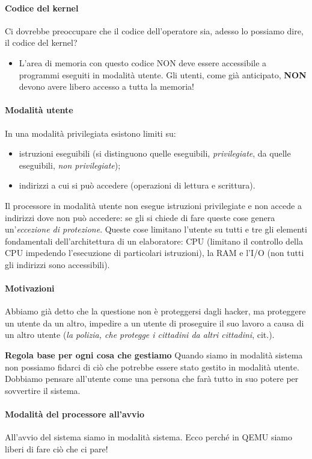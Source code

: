 \documentclass[11pt]{report}
\theoremstyle{definition}
\begin{document}
\paragraph{Codice del kernel} Ci dovrebbe preoccupare che il codice dell'operatore sia, adesso lo possiamo dire, il codice del kernel? 
\begin{itemize}
	\item L'area di memoria con questo codice NON deve essere accessibile a programmi eseguiti in modalità utente. Gli utenti, come già anticipato, \textbf{NON} devono avere libero accesso a tutta la memoria!
\end{itemize}
\paragraph{Modalità utente} In una modalità privilegiata esistono limiti su:
\begin{itemize}
	\item istruzioni eseguibili (si distinguono quelle eseguibili, \emph{privilegiate}, da quelle eseguibili, \emph{non privilegiate});
	\item indirizzi a cui si può accedere (operazioni di lettura e scrittura).
\end{itemize}
Il processore in modalità utente non esegue istruzioni privilegiate e non accede a indirizzi dove non può accedere: se gli si chiede di fare queste cose genera un'\emph{eccezione di protezione}. Queste cose limitano l'utente su tutti e tre gli elementi fondamentali dell'architettura di un elaboratore: CPU (limitano il controllo della CPU impedendo l'esecuzione di particolari istruzioni), la RAM e l'I/O (non tutti gli indirizzi sono accessibili). 
\paragraph{Motivazioni} Abbiamo già detto che la questione non è proteggersi dagli hacker, ma proteggere un utente da un altro, impedire a un utente di proseguire il suo lavoro a causa di un altro utente (\emph{la polizia, che protegge i cittadini da altri cittadini}, cit.). 
\begin{framed}\noindent\textbf{Regola base per ogni cosa che gestiamo} Quando siamo in modalità sistema non possiamo fidarci di ciò che potrebbe essere stato gestito in modalità utente. Dobbiamo pensare all'utente come una persona che farà tutto in suo potere per sovvertire il sistema.
\end{framed}\paragraph{Modalità del processore all'avvio} All'avvio del sistema siamo in modalità sistema. Ecco perché in QEMU siamo liberi di fare ciò che ci pare! 
\end{document}
